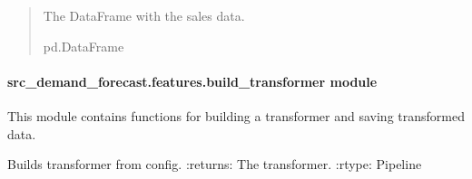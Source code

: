 \documentclass[letterpaper,10pt,english]{sphinxmanual}
\begin{document}
\begin{fulllineitems}
\begin{quote}
\begin{description}
\begin{itemize}
\end{itemize}

\sphinxAtStartPar
The DataFrame with the sales data.

\sphinxAtStartPar
pd.DataFrame

\end{description}\end{quote}

\end{fulllineitems}



\paragraph{src\_demand\_forecast.features.build\_transformer module}
\label{\detokenize{src_demand_forecast.features:module-src_demand_forecast.features.build_transformer}}\label{\detokenize{src_demand_forecast.features:src-demand-forecast-features-build-transformer-module}}
\sphinxAtStartPar
This module contains functions for building a transformer and saving transformed data.

\begin{fulllineitems}
\label{\detokenize{src_demand_forecast.features:src_demand_forecast.features.build_transformer.features_and_targets_transformer}}
\pysigstartsignatures
{}
\pysigstopsignatures
\sphinxAtStartPar
Builds transformer from config.
:returns: The transformer.
:rtype: Pipeline

\end{fulllineitems}

\end{document}
